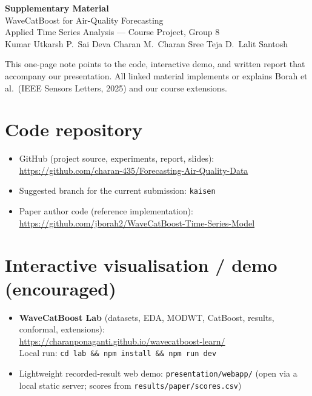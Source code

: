 \documentclass[11pt,a4paper]{article}
\begin{document}
\begin{center}
  {\LARGE\bfseries Supplementary Material}\\[0.45em]
  {\large WaveCatBoost for Air-Quality Forecasting}\\[0.35em]
  {\normalsize Applied Time Series Analysis --- Course Project, Group 8}\\[0.25em]
  {\small Kumar Utkarsh \quad
   P.~Sai Deva Charan \quad
   M.~Charan Sree Teja \quad
   D.~Lalit Santosh}
\end{center}

\vspace{0.6em}
\noindent
This one-page note points to the code, interactive demo, and written report that accompany our presentation. All linked material implements or explains Borah et al.\ (IEEE Sensors Letters, 2025) and our course extensions.

\section*{Code repository}
\begin{itemize}[leftmargin=1.2em,itemsep=0.25em]
  \item GitHub (project source, experiments, report, slides):\\
        \url{https://github.com/charan-435/Forecasting-Air-Quality-Data}
  \item Suggested branch for the current submission: \texttt{kaisen}
  \item Paper author code (reference implementation):\\
        \url{https://github.com/jborah2/WaveCatBoost-Time-Series-Model}
\end{itemize}

\section*{Interactive visualisation / demo (encouraged)}
\begin{itemize}[leftmargin=1.2em,itemsep=0.25em]
  \item \textbf{WaveCatBoost Lab} (datasets, EDA, MODWT, CatBoost, results, conformal, extensions):\\
        \url{https://charanponaganti.github.io/wavecatboost-learn/}\\
        Local run: \texttt{cd lab \&\& npm install \&\& npm run dev}
  \item Lightweight recorded-result web demo: \texttt{presentation/webapp/}
        (open via a local static server; scores from \texttt{results/paper/scores.csv})
\end{itemize}
\end{document}
